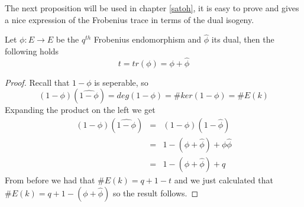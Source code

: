 The next proposition will be used in chapter \ref{satoh}, it is easy to prove and gives a nice
expression of the Frobenius trace in terms of the dual isogeny.

\begin{prop}
 Let $\phi: E \rightarrow E$ be the $q^{th}$ Frobenius endomorphism and $\widehat{\phi}$ its dual, then
the following holds
$$ t = tr(\phi) = \phi + \widehat{\phi}$$
\end{prop}
\begin{proof}
 Recall that $1-\phi$ is seperable, so $$(1-\phi)(\widehat{1-\phi}) = deg(1-\phi) = \#ker(1-\phi) = \#E(k)$$
Expanding the product on the left we get
\begin{eqnarray}
 (1-\phi)(\widehat{1-\phi}) &=& (1-\phi)(1-\widehat{\phi}) \nonumber \\
			    &=& 1 - (\phi + \widehat{\phi}) + \phi\widehat{\phi} \nonumber \\
			    &=& 1 - (\phi + \widehat{\phi}) + q \nonumber
\end{eqnarray}
From before we had that $\#E(k) = q + 1 - t$ and we just calculated that $\#E(k) = q + 1 - (\phi +\widehat{\phi})$ so
the result follows.
\end{proof}

